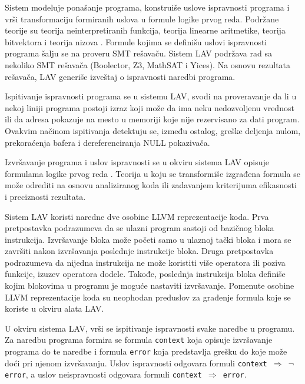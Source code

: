 \documentclass[12pt,oneside]{memoir}
\begin{document}
Sistem modeluje ponašanje programa, konstruiše uslove ispravnosti programa i vrši transformaciju formiranih uslova u formule logike prvog reda. Podržane teorije su teorija neinterpretiranih funkcija, teorija linearne aritmetike, teorija bitvektora i teorija nizova \cite{Barrett}. Formule kojima se definišu uslovi ispravnosti programa šalju se na proveru SMT rešavaču. Sistem LAV podržava rad sa nekoliko SMT rešavača (Boolector, Z3, MathSAT i Yices). Na osnovu rezultata rešavača, LAV generiše izveštaj o ispravnosti naredbi programa.
\par

Ispitivanje ispravnosti programa se u sistemu LAV, svodi na proveravanje da li u nekoj liniji programa postoji izraz koji može da ima neku nedozvoljenu vrednost ili da adresa pokazuje na mesto u memoriji koje nije rezervisano za dati program. Ovakvim načinom ispitivanja detektuju se, između ostalog, greške deljenja nulom, prekoraćenja bafera i dereferenciranja NULL pokazivača.

\par

Izvršavanje programa i uslov ispravnosti se u okviru sistema LAV opisuje formulama logike prvog reda \cite{vstteLAV12}. Teorija u koju se transformiše izgrađena formula se može odrediti na osnovu analiziranog koda ili zadavanjem kriterijuma efikasnosti i preciznosti rezultata.
\par

Sistem LAV koristi naredne dve osobine LLVM reprezentacije koda. Prva pretpostavka podrazumeva da se ulazni program sastoji od bazičnog bloka instrukcija. Izvršavanje bloka može početi samo u ulaznoj tački bloka i mora se završiti nakon izvršavanja poslednje instrukcije bloka. Druga pretpostavka podrazumeva da nijedna instrukcija ne može koristiti više operatora ili poziva funkcije, izuzev operatora dodele. Takođe, poslednja instrukcija bloka definiše kojim blokovima u programu je moguće nastaviti izvršavanje. Pomenute osobine LLVM reprezentacije koda su neophodan preduslov za građenje formula koje se koriste u okviru alata LAV.
\par
U okviru sistema LAV, vrši se ispitivanje ispravnosti svake naredbe u programu. 
Za naredbu programa formira se formula \texttt{context} koja opisuje izvršavanje programa do te naredbe i formula \texttt{error} koja predstavlja grešku do koje može doći pri njenom izvršavanju. Uslov ispravnosti odgovara formuli \texttt{context $\Rightarrow$ $\neg$ error}, a uslov neispravnosti odgovara formuli \texttt{context $\Rightarrow$ error}. 
\end{document}
